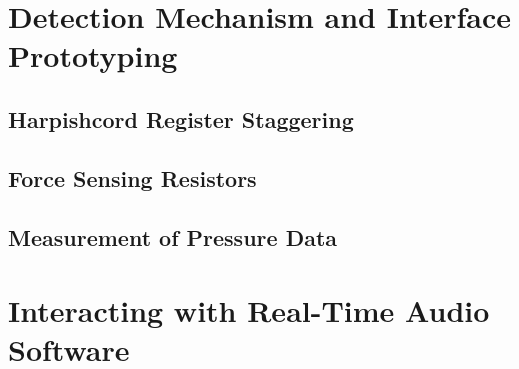 \section{Detection Mechanism and Interface Prototyping}
\subsection{Harpishcord Register Staggering}
\subsection{Force Sensing Resistors}
\subsection{Measurement of Pressure Data}
\section{Interacting with Real-Time Audio Software}



